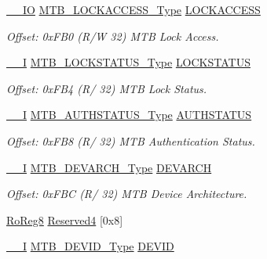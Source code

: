 \begin{DoxyCompactItemize}
\item 
\mbox{\hyperlink{core__cm0plus_8h_aec43007d9998a0a0e01faede4133d6be}{\+\_\+\+\_\+\+IO}} \mbox{\hyperlink{union_m_t_b___l_o_c_k_a_c_c_e_s_s___type}{M\+T\+B\+\_\+\+L\+O\+C\+K\+A\+C\+C\+E\+S\+S\+\_\+\+Type}} \mbox{\hyperlink{struct_mtb_a75c37ac080c67093d3b340f550f4ba91}{L\+O\+C\+K\+A\+C\+C\+E\+SS}}
\begin{DoxyCompactList}\small\item\em Offset\+: 0x\+F\+B0 (R/W 32) M\+TB Lock Access. \end{DoxyCompactList}\item 
\mbox{\hyperlink{core__cm0plus_8h_af63697ed9952cc71e1225efe205f6cd3}{\+\_\+\+\_\+I}} \mbox{\hyperlink{union_m_t_b___l_o_c_k_s_t_a_t_u_s___type}{M\+T\+B\+\_\+\+L\+O\+C\+K\+S\+T\+A\+T\+U\+S\+\_\+\+Type}} \mbox{\hyperlink{struct_mtb_af15d9c6990b0c16ab44c70f50a2e94d2}{L\+O\+C\+K\+S\+T\+A\+T\+US}}
\begin{DoxyCompactList}\small\item\em Offset\+: 0x\+F\+B4 (R/ 32) M\+TB Lock Status. \end{DoxyCompactList}\item 
\mbox{\hyperlink{core__cm0plus_8h_af63697ed9952cc71e1225efe205f6cd3}{\+\_\+\+\_\+I}} \mbox{\hyperlink{union_m_t_b___a_u_t_h_s_t_a_t_u_s___type}{M\+T\+B\+\_\+\+A\+U\+T\+H\+S\+T\+A\+T\+U\+S\+\_\+\+Type}} \mbox{\hyperlink{struct_mtb_a4a39125e80e87e5b60ef71e9bd68c4da}{A\+U\+T\+H\+S\+T\+A\+T\+US}}
\begin{DoxyCompactList}\small\item\em Offset\+: 0x\+F\+B8 (R/ 32) M\+TB Authentication Status. \end{DoxyCompactList}\item 
\mbox{\hyperlink{core__cm0plus_8h_af63697ed9952cc71e1225efe205f6cd3}{\+\_\+\+\_\+I}} \mbox{\hyperlink{union_m_t_b___d_e_v_a_r_c_h___type}{M\+T\+B\+\_\+\+D\+E\+V\+A\+R\+C\+H\+\_\+\+Type}} \mbox{\hyperlink{struct_mtb_ad915ff99052a4a66c854be316bb4b02d}{D\+E\+V\+A\+R\+CH}}
\begin{DoxyCompactList}\small\item\em Offset\+: 0x\+F\+BC (R/ 32) M\+TB Device Architecture. \end{DoxyCompactList}\item 
\mbox{\hyperlink{group___s_a_m_d21_e15_a__definitions_ga0d957f1433aaf5d70e4dc2b68288442d}{Ro\+Reg8}} \mbox{\hyperlink{struct_mtb_ab7b3e550ab30de0179365b0293537564}{Reserved4}} \mbox{[}0x8\mbox{]}
\item 
\mbox{\hyperlink{core__cm0plus_8h_af63697ed9952cc71e1225efe205f6cd3}{\+\_\+\+\_\+I}} \mbox{\hyperlink{union_m_t_b___d_e_v_i_d___type}{M\+T\+B\+\_\+\+D\+E\+V\+I\+D\+\_\+\+Type}} \mbox{\hyperlink{struct_mtb_a8136bd1822f34a8788029bcbb678cfd2}{D\+E\+V\+ID}}

\end{DoxyCompactItemize}
